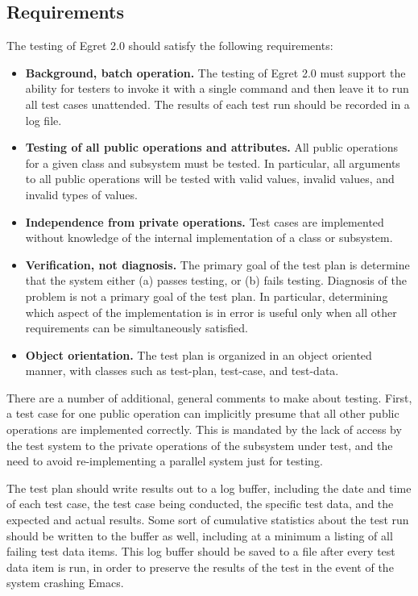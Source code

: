 \subsection{Requirements}

The testing of Egret 2.0 should satisfy the following requirements:

\begin{itemize}
\item {\bf Background, batch operation.}  The testing of Egret 2.0 must support
the ability for testers to invoke it with a single command and then leave it to 
run all test cases unattended.  The results of each test run should be recorded
in a log file.

\item {\bf Testing of all public operations and attributes.}  All public operations for a 
given class and subsystem must be tested.  In particular, all 
arguments to all public operations will be tested with valid values,
invalid values, and invalid types of values.

\item {\bf Independence from private operations.}  Test cases are implemented
without knowledge of the internal implementation of a class or subsystem. 

\item {\bf Verification, not diagnosis.} The primary goal of the test plan is
determine that the system either (a) passes testing, or (b) fails
testing.  Diagnosis of the problem is not a primary goal of the test plan.
In particular, determining which aspect of the implementation is in error 
is useful only when all other requirements can be simultaneously satisfied.

\item {\bf Object orientation.}  The test plan is organized in an object
oriented manner, with classes such as {\sf test-plan}, {\sf test-case}, 
and {\sf test-data}.
\end{itemize}

There are a number of additional, general comments to make about testing.
First, a test case for one public operation can implicitly presume that all other
public operations are implemented correctly.   This is mandated by the lack
of access by the test system to the private operations of the subsystem under
test, and the need to avoid re-implementing a parallel system just for testing.

The test plan should write results out to a log buffer, including the
date and time of each test case, the test case being conducted, the
specific test data, and the expected and actual results.  Some sort of
cumulative statistics about the test run should be written to the
buffer as well, including at a minimum a listing of all failing test
data items.  This log buffer should be saved to a file after every
test data item is run, in order to preserve the results of the test in
the event of the system crashing Emacs.

